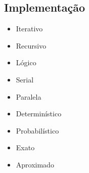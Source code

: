 \subsection{Implementação}%
\begin{frame}[label=main]
	\begin{itemize}
	    \item Iterativo%
	    \item Recursivo%
	    \vfill\pause
		\item Lógico%
	    \vfill\pause
		\item Serial%
		\item Paralela%
	    \vfill\pause
		\item Determinístico%
		\item Probabilístico%
	    \vfill\pause
		\item Exato%
		\item Aproximado%
	\end{itemize}
\end{frame}

